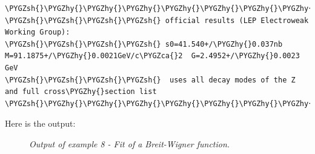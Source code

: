 \documentclass[a4paper,10pt,english]{sphinxmanual}
\def\PYGZca{\char`\^}
\def\PYGZsh{\char`\#}
\def\PYGZhy{\char`\-}
\begin{document}
\begin{Verbatim}[commandchars=\\\{\}]
\PYGZsh{}\PYGZhy{}\PYGZhy{}\PYGZhy{}\PYGZhy{}\PYGZhy{}\PYGZhy{}\PYGZhy{}\PYGZhy{}\PYGZhy{}\PYGZhy{}\PYGZhy{}\PYGZhy{}\PYGZhy{}\PYGZhy{}\PYGZhy{}\PYGZhy{}\PYGZhy{}\PYGZhy{}\PYGZhy{}\PYGZhy{}\PYGZhy{}\PYGZhy{}\PYGZhy{}\PYGZhy{}\PYGZhy{}\PYGZhy{}\PYGZhy{}\PYGZhy{}\PYGZhy{}\PYGZhy{}\PYGZhy{}\PYGZhy{}\PYGZhy{}\PYGZhy{}\PYGZhy{}\PYGZhy{}\PYGZhy{}\PYGZhy{}\PYGZhy{}\PYGZhy{}\PYGZhy{}\PYGZhy{}\PYGZhy{}\PYGZhy{}\PYGZhy{}\PYGZhy{}\PYGZhy{}\PYGZhy{}\PYGZhy{}\PYGZhy{}\PYGZhy{}\PYGZhy{}\PYGZhy{}\PYGZhy{}\PYGZhy{}\PYGZhy{}\PYGZhy{}\PYGZhy{}\PYGZhy{}\PYGZhy{}\PYGZhy{}\PYGZhy{}\PYGZhy{}\PYGZhy{}\PYGZhy{}\PYGZhy{}\PYGZhy{}\PYGZhy{}\PYGZhy{}\PYGZhy{}\PYGZhy{}\PYGZhy{}\PYGZhy{}\PYGZhy{}\PYGZhy{}
\PYGZsh{}\PYGZsh{}\PYGZsh{}\PYGZsh{} official results (LEP Electroweak Working Group):
\PYGZsh{}\PYGZsh{}\PYGZsh{}\PYGZsh{} s0=41.540+/\PYGZhy{}0.037nb  M=91.1875+/\PYGZhy{}0.0021GeV/c\PYGZca{}2  G=2.4952+/\PYGZhy{}0.0023 GeV
\PYGZsh{}\PYGZsh{}\PYGZsh{}\PYGZsh{}  uses all decay modes of the Z and full cross\PYGZhy{}section list
\PYGZsh{}\PYGZhy{}\PYGZhy{}\PYGZhy{}\PYGZhy{}\PYGZhy{}\PYGZhy{}\PYGZhy{}\PYGZhy{}\PYGZhy{}\PYGZhy{}\PYGZhy{}\PYGZhy{}\PYGZhy{}\PYGZhy{}\PYGZhy{}\PYGZhy{}\PYGZhy{}\PYGZhy{}\PYGZhy{}\PYGZhy{}\PYGZhy{}\PYGZhy{}\PYGZhy{}\PYGZhy{}\PYGZhy{}\PYGZhy{}\PYGZhy{}\PYGZhy{}\PYGZhy{}\PYGZhy{}\PYGZhy{}\PYGZhy{}\PYGZhy{}\PYGZhy{}\PYGZhy{}\PYGZhy{}\PYGZhy{}\PYGZhy{}\PYGZhy{}\PYGZhy{}\PYGZhy{}\PYGZhy{}\PYGZhy{}\PYGZhy{}\PYGZhy{}\PYGZhy{}\PYGZhy{}\PYGZhy{}\PYGZhy{}\PYGZhy{}\PYGZhy{}\PYGZhy{}\PYGZhy{}\PYGZhy{}\PYGZhy{}\PYGZhy{}\PYGZhy{}\PYGZhy{}\PYGZhy{}\PYGZhy{}\PYGZhy{}\PYGZhy{}\PYGZhy{}\PYGZhy{}\PYGZhy{}\PYGZhy{}\PYGZhy{}\PYGZhy{}\PYGZhy{}\PYGZhy{}\PYGZhy{}\PYGZhy{}\PYGZhy{}\PYGZhy{}\PYGZhy{}
\end{Verbatim}

Here is the output:
\begin{figure}[htbp]
\centering
\capstart

\caption{\emph{Output of example 8 - Fit of a Breit-Wigner function.}}\end{figure}
\end{document}
